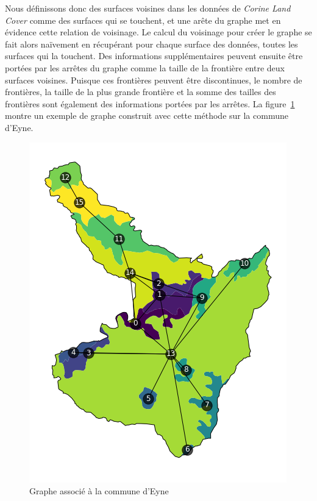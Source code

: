 Nous définissons donc des surfaces voisines dans les données de \emph{Corine Land Cover} comme des surfaces qui se touchent, et une arête du graphe met en évidence cette relation de voisinage.
Le calcul du voisinage pour créer le graphe se fait alors naïvement en récupérant pour chaque surface des données, toutes les surfaces qui la touchent.
Des informations supplémentaires peuvent ensuite être portées par les arrêtes du graphe comme la taille de la frontière entre deux surfaces voisines.
Puisque ces frontières peuvent être discontinues, le nombre de frontières, la taille de la plus grande frontière et la somme des tailles des frontières sont également des informations portées par les arrêtes.
La figure~\ref{fig:eyne-map-graph} montre un exemple de graphe construit avec cette méthode sur la commune d'Eyne.


\begin{figure}[!h]
    \centering
    \includegraphics[scale=0.5]{images/eyne-map-graph}
    \caption{Graphe associé à la commune d'Eyne}
    \label{fig:eyne-map-graph}
\end{figure}
